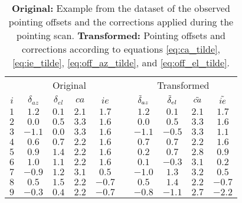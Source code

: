 \begin{table}[H]
    \centering
    \caption{\textbf{Original:} Example from the dataset of the observed pointing offsets and the corrections applied during the pointing scan.
    \textbf{Transformed:} Pointing offsets and corrections according to equations \eqref{eq:ca_tilde}, \eqref{eq:ie_tilde}, \eqref{eq:off_az_tilde}, and \eqref{eq:off_el_tilde}.}
    \label{tab:offset_and_corrections}
    \begin{tabular}{c cccc c cccc}
    \toprule
    \multicolumn{1}{c}{} & \multicolumn{4}{c}{Original} & \multicolumn{1}{c}{} & \multicolumn{4}{c}{Transformed} \\
    \cmidrule(lr){2-5} \cmidrule(lr){7-10} 
    $i$ &  $\delta_{az}$ &  $\delta_{el}$ &  $ca$ & $ie$  & & $\Tilde{\delta}_{az}$ &  $\Tilde{\delta}_{el}$ &  $\Tilde{ca}$ &  $\Tilde{ie}$ \\
    \midrule
    $1$ &     $1.2$ & $0.1$ & $2.1$ &  $1.7$ &   &    $1.2$ &       $0.1$ &       $2.1$ &       $1.7$ \\
    $2$ &     $0.0$ & $0.5$ & $3.3$ &  $1.6$ &   &    $0.0$ &       $0.5$ &       $3.3$ &       $1.6$ \\
    $3$ &    $-1.1$ & $0.0$ & $3.3$ &  $1.6$ &   &   $-1.1$ &      $-0.5$ &       $3.3$ &       $1.1$ \\
    $4$ &     $0.6$ & $0.7$ & $2.2$ &  $1.6$ &   &    $0.7$ &       $0.7$ &       $2.2$ &       $1.6$ \\
    $5$ &     $0.9$ & $1.4$ & $2.2$ &  $1.6$ &   &    $0.2$ &       $0.7$ &       $2.8$ &       $0.9$ \\
    $6$ &     $1.0$ & $1.1$ & $2.2$ &  $1.6$ &   &    $0.1$ &      $-0.3$ &       $3.1$ &       $0.2$ \\
    $7$ &    $-0.9$ & $1.2$ & $3.1$ &  $0.5$ &   &   $-1.0$ &       $1.3$ &       $3.2$ &       $0.5$ \\
    $8$ &     $0.5$ & $1.5$ & $2.2$ & $-0.7$ &   &    $0.5$ &       $1.4$ &       $2.2$ &      $-0.7$ \\
    $9$ &    $-0.3$ & $0.4$ & $2.2$ & $-0.7$ &   &   $-0.8$ &      $-1.1$ &       $2.7$ &      $-2.2$ \\
    \bottomrule
    \end{tabular}
\end{table}